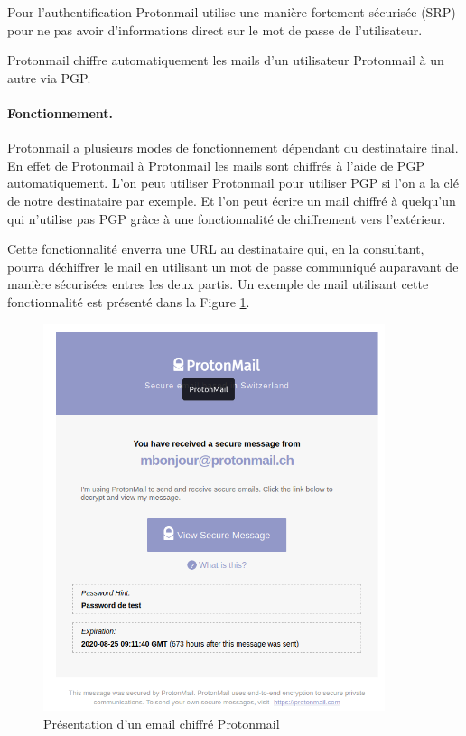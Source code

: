 Pour l'authentification Protonmail utilise une manière fortement sécurisée (SRP) pour ne pas avoir d'informations direct sur le mot de passe de l'utilisateur.

Protonmail chiffre automatiquement les mails d'un utilisateur Protonmail à un autre via PGP.
\paragraph*{Fonctionnement.}
Protonmail a plusieurs modes de fonctionnement dépendant du destinataire final. En effet de Protonmail à Protonmail les mails sont chiffrés à l'aide de PGP automatiquement. L'on peut utiliser Protonmail pour utiliser PGP si l'on a la clé de notre destinataire par exemple. Et l'on peut écrire un mail chiffré à quelqu'un qui n'utilise pas PGP grâce à une fonctionnalité de chiffrement vers l'extérieur.

Cette fonctionnalité enverra une URL au destinataire qui, en la consultant, pourra déchiffrer le mail en utilisant un mot de passe communiqué auparavant de manière sécurisées entres les deux partis. Un exemple de mail utilisant cette fonctionnalité est présenté dans la Figure \ref{fig:ProtonmailPres}.

\begin{figure}[h!]
	\includegraphics[width=10cm]{images/protonmailPresentation.png}
	\centering
	\caption{Présentation d'un email chiffré Protonmail}
	\label{fig:ProtonmailPres}
\end{figure}

